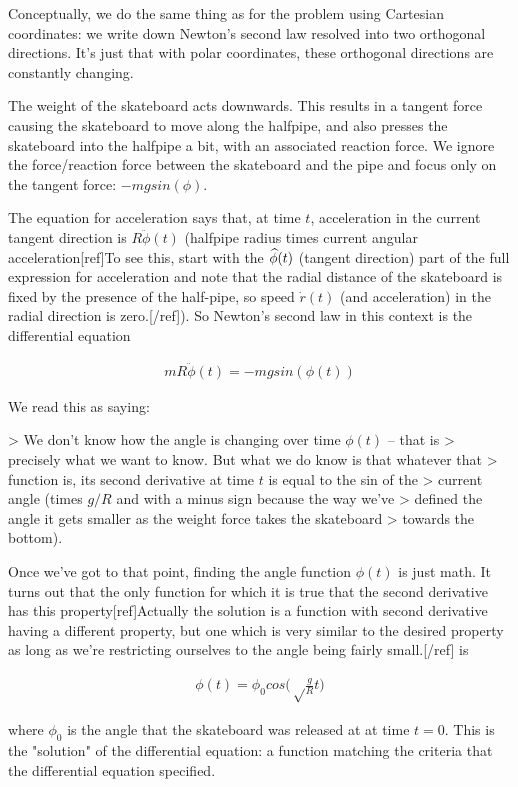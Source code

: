 Conceptually, we do the same thing as for the problem using Cartesian
coordinates: we write down Newton's second law resolved into two orthogonal
directions. It's just that with polar coordinates, these orthogonal directions
are constantly changing.

The weight of the skateboard acts downwards. This results in a tangent force
causing the skateboard to move along the halfpipe, and also presses the
skateboard into the halfpipe a bit, with an associated reaction force. We
ignore the force/reaction force between the skateboard and the pipe and focus
only on the tangent force: $-mg sin(\phi)$.

The equation for acceleration says that, at time $t$, acceleration in the
current tangent direction is $R\ddot \phi(t)$ (halfpipe radius times current
angular acceleration[ref]To see this, start with the $\mathbf{\widehat{\phi}}(t)$ (tangent
direction) part of the full expression for acceleration and note that the
radial distance of the skateboard is fixed by the presence of the half-pipe, so
speed $\dot r(t)$ (and acceleration) in the radial direction is
zero.[/ref]). So Newton's second law in this context is the differential
equation

\begin{align*}
mR \ddot \phi(t) = -mg sin(\phi(t))
\end{align*}

We read this as saying:

> We don't know how the angle is changing over time $\phi(t)$ -- that is
> precisely what we want to know. But what we do know is that whatever that
> function is, its second derivative at time $t$ is equal to the sin of the
> current angle (times $g/R$ and with a minus sign because the way we've
> defined the angle it gets smaller as the weight force takes the skateboard
> towards the bottom).

Once we've got to that point, finding the angle function $\phi(t)$ is just
math. It turns out that the only function for which it is true that the second
derivative has this property[ref]Actually the solution is a function with
second derivative having a different property, but one which is very similar to
the desired property as long as we're restricting ourselves to the angle being
fairly small.[/ref] is


\begin{align*}
  \phi(t) = \phi_0 cos\bigg(\sqrt\frac{g}{R}t\bigg)
\end{align*}

where $\phi_0$ is the angle that the skateboard was released at at time $t=0$.
This is the "solution" of the differential equation: a function matching the
criteria that the differential equation specified.

